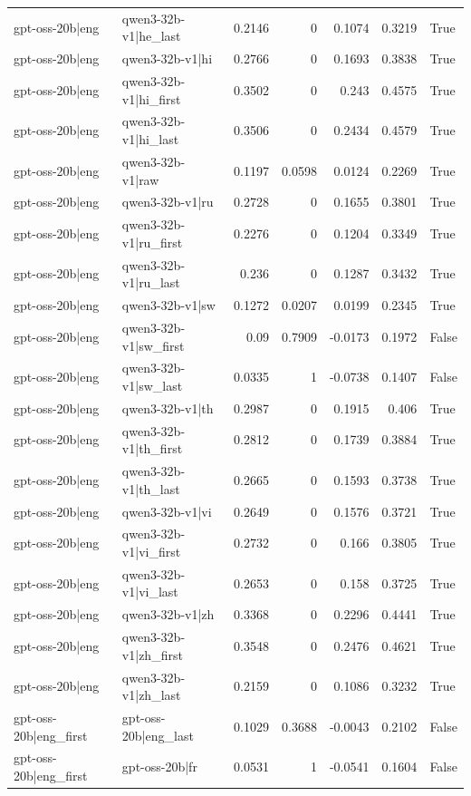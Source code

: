 \begin{table}
\begin{tabular}{l l r r r r l}
gpt-oss-20b|eng & qwen3-32b-v1|he_last & 0.2146 & 0 & 0.1074 & 0.3219 & True \\
gpt-oss-20b|eng & qwen3-32b-v1|hi & 0.2766 & 0 & 0.1693 & 0.3838 & True \\
gpt-oss-20b|eng & qwen3-32b-v1|hi_first & 0.3502 & 0 & 0.243 & 0.4575 & True \\
gpt-oss-20b|eng & qwen3-32b-v1|hi_last & 0.3506 & 0 & 0.2434 & 0.4579 & True \\
gpt-oss-20b|eng & qwen3-32b-v1|raw & 0.1197 & 0.0598 & 0.0124 & 0.2269 & True \\
gpt-oss-20b|eng & qwen3-32b-v1|ru & 0.2728 & 0 & 0.1655 & 0.3801 & True \\
gpt-oss-20b|eng & qwen3-32b-v1|ru_first & 0.2276 & 0 & 0.1204 & 0.3349 & True \\
gpt-oss-20b|eng & qwen3-32b-v1|ru_last & 0.236 & 0 & 0.1287 & 0.3432 & True \\
gpt-oss-20b|eng & qwen3-32b-v1|sw & 0.1272 & 0.0207 & 0.0199 & 0.2345 & True \\
gpt-oss-20b|eng & qwen3-32b-v1|sw_first & 0.09 & 0.7909 & -0.0173 & 0.1972 & False \\
gpt-oss-20b|eng & qwen3-32b-v1|sw_last & 0.0335 & 1 & -0.0738 & 0.1407 & False \\
gpt-oss-20b|eng & qwen3-32b-v1|th & 0.2987 & 0 & 0.1915 & 0.406 & True \\
gpt-oss-20b|eng & qwen3-32b-v1|th_first & 0.2812 & 0 & 0.1739 & 0.3884 & True \\
gpt-oss-20b|eng & qwen3-32b-v1|th_last & 0.2665 & 0 & 0.1593 & 0.3738 & True \\
gpt-oss-20b|eng & qwen3-32b-v1|vi & 0.2649 & 0 & 0.1576 & 0.3721 & True \\
gpt-oss-20b|eng & qwen3-32b-v1|vi_first & 0.2732 & 0 & 0.166 & 0.3805 & True \\
gpt-oss-20b|eng & qwen3-32b-v1|vi_last & 0.2653 & 0 & 0.158 & 0.3725 & True \\
gpt-oss-20b|eng & qwen3-32b-v1|zh & 0.3368 & 0 & 0.2296 & 0.4441 & True \\
gpt-oss-20b|eng & qwen3-32b-v1|zh_first & 0.3548 & 0 & 0.2476 & 0.4621 & True \\
gpt-oss-20b|eng & qwen3-32b-v1|zh_last & 0.2159 & 0 & 0.1086 & 0.3232 & True \\
gpt-oss-20b|eng_first & gpt-oss-20b|eng_last & 0.1029 & 0.3688 & -0.0043 & 0.2102 & False \\
gpt-oss-20b|eng_first & gpt-oss-20b|fr & 0.0531 & 1 & -0.0541 & 0.1604 & False \\

\end{tabular}
\end{table}
